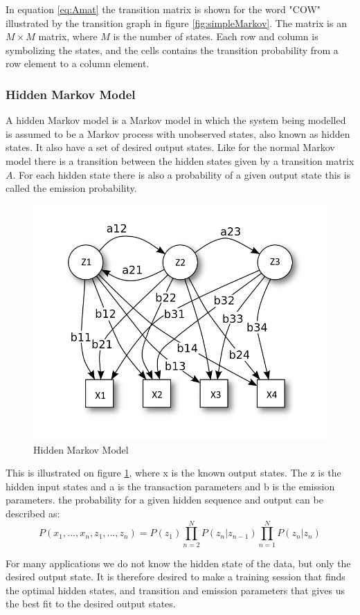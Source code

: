 In equation \ref{eq:Amat} the transition matrix is shown for the word "COW" illustrated by the transition graph in figure \ref{fig:simpleMarkov}. The matrix is an $M\times M$ matrix, where $M$ is the number of states. Each row and column is symbolizing the states, and the cells contains the transition probability from a row element to a column element.


\subsubsection{Hidden Markov Model}
A hidden Markov model is a Markov model in which the system being modelled is assumed to be a Markov process with unobserved states, also known as hidden states. It also have a set of desired output states. Like for the normal Markov model there is a transition between the hidden states given by a transition matrix $A$. For each hidden state there is also a probability of a given output state this is called the emission probability.

\begin{figure}[H]
\centering
\includegraphics[scale=0.5]{billeder/HiddenMarkovModel}
\caption{Hidden Markov Model}
\label{fig:HiddenMarkov}
\end{figure}

This is illustrated on figure \ref{fig:HiddenMarkov}, where x is the known output states. The z is the hidden input states and a is the transaction parameters and b is the emission parameters. the probability for a given hidden sequence and output can be described as: 
\begin{equation}
 P(x_1, ..., x_n, z_1, ..., z_n) = P(z_1) \prod\limits_{n=2}^N{P(z_n| z_{n-1})} 
\prod\limits_{n=1}^N{P(z_n| z_n)}
\end{equation}
 
For many applications we do not know the hidden state of the data, but only the desired output state. It is therefore desired to make a training session that finds the optimal hidden states, and transition and emission parameters that gives us the best fit to the desired output states. 

